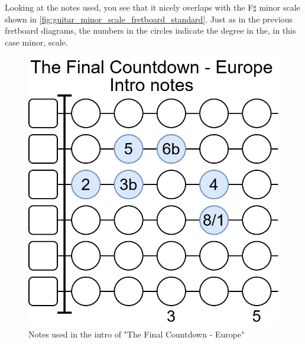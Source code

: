 Looking at the notes used, you see that it nicely overlaps with the F$\sharp$ minor scale shown in \autoref{fig:guitar_minor_scale_fretboard_standard}. Just as in the previous fretboard diagrams, the numbers in the circles indicate the degree in the, in this case minor, scale.

\begin{figure}[h]
	\centering
	\includegraphics[height=0.2\textheight]{../../Images/NotesUsedInTheFinalCountdownEuropeIntro.png}
	\caption{Notes used in the intro of "The Final Countdown - Europe"}
	\label{fig:guitar_the_final_countdown_europe_fretboard_minor_scale}
\end{figure}


